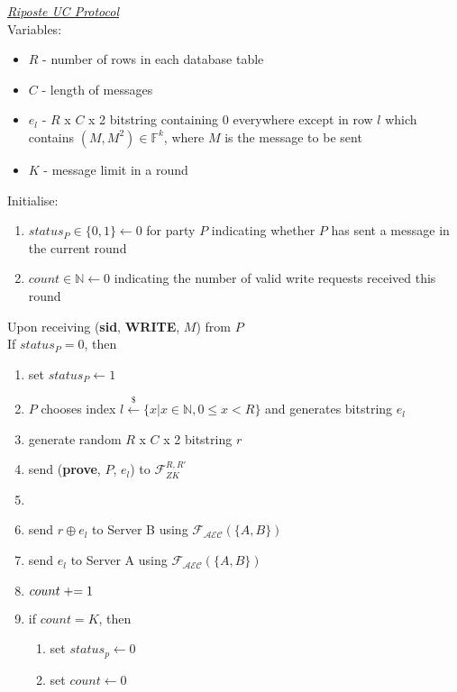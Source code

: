 \begin{tcolorbox}[colback=white, arc=5pt]
\noindent\emph{\underline{Riposte UC Protocol}}\\[5pt]
Variables:
\begin{itemize}
    \item $R$ - number of rows in each database table
    \item $C$ - length of messages
    \item $e_l$ - $R$ x $C$ x 2 bitstring containing 0 everywhere except in row $l$ which contains $(M, M^2)\in \mathbb{F}^k$, where $M$ is the message to be sent
    \item $K$ - message limit in a round
\end{itemize}
 Initialise:
 \begin{enumerate}
     \item $status_P\in\{0,1\}\leftarrow 0$ for party $P$ indicating whether $P$ has sent a message in the current round
     \item $count\in\mathbb{N}\leftarrow 0$ indicating the number of valid write requests received this round
 \end{enumerate}
 
 
\extitem Upon receiving (\textbf{sid}, \textbf{WRITE}, $M$) from $P$\\
If $status_P=0$, then
\begin{enumerate}
    \item set $status_P\leftarrow 1$
    \item $P$ chooses index $l \overset{{\scriptscriptstyle\$}}{\leftarrow} \{x | x \in \mathbb{N}, 0 \le x < R\}$ and generates bitstring $e_l$
    \item generate random $R$ x $C$ x 2 bitstring $r$
    \item send (\textbf{prove}, $P$, $e_l$) to $\mathcal{F}_{ZK}^{R,R'}$
    \item 
    \item send $r\oplus e_l$ to Server B using $\mathcal{F}_{\mathcal{AEC}}(\{A,B\})$
    \item send $e_l$ to Server A using $\mathcal{F}_{\mathcal{AEC}}(\{A,B\})$
    
    \item $count \mathrel{+}= 1$
    \item if $count=K$, then
    \begin{enumerate}
        \item set $status_p\leftarrow0$
        \item set $count \leftarrow 0$
    \end{enumerate}
\end{enumerate}


\end{tcolorbox}
